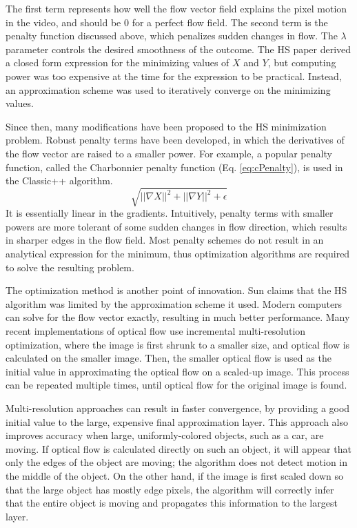 \documentclass[10pt,twocolumn,letterpaper]{article}
\begin{document}
The first term represents how well the flow vector field explains the pixel motion in the video, and should be 0 for a perfect flow field. The second term is the penalty function discussed above, which penalizes sudden changes in flow. The $\lambda$ parameter controls the desired smoothness of the outcome. The HS paper derived a closed form expression for the minimizing values of $X$ and $Y$, but computing power was too expensive at the time for the expression to be practical. Instead, an approximation scheme was used to iteratively converge on the minimizing values.

Since then, many modifications have been proposed to the HS minimization problem. Robust penalty terms have been developed, in which the derivatives of the flow vector are raised to a smaller power. For example, a popular penalty function, called the Charbonnier penalty function (Eq. \ref{eq:cPenalty}), is used in the Classic++ algorithm.
\begin{equation} \label{eq:cPenalty}
\sqrt{|| \nabla X ||^2 + || \nabla Y ||^2 + \epsilon}
\end{equation}
It is essentially linear in the gradients. Intuitively, penalty terms with smaller powers are more tolerant of some sudden changes in flow direction, which results in sharper edges in the flow field. Most penalty schemes do not result in an analytical expression for the minimum, thus optimization algorithms are required to solve the resulting problem.

The optimization method is another point of innovation. Sun \cite{sun} claims that the HS algorithm was limited by the approximation scheme it used. Modern computers can solve for the flow vector exactly, resulting in much better performance. Many recent implementations of optical flow use incremental multi-resolution optimization, where the image is first shrunk to a smaller size, and optical flow is calculated on the smaller image. Then, the smaller optical flow is used as the initial value in approximating the optical flow on a scaled-up image. This process can be repeated multiple times, until optical flow for the original image is found.

Multi-resolution approaches can result in faster convergence, by providing a good initial value to the large, expensive final approximation layer. This approach also improves accuracy when large, uniformly-colored objects, such as a car, are moving. If optical flow is calculated directly on such an object, it will appear that only the edges of the object are moving; the algorithm does not detect motion in the middle of the object. On the other hand, if the image is first scaled down so that the large object has mostly edge pixels, the algorithm will correctly infer that the entire object is moving and propagates this information to the largest layer.
\end{document}
